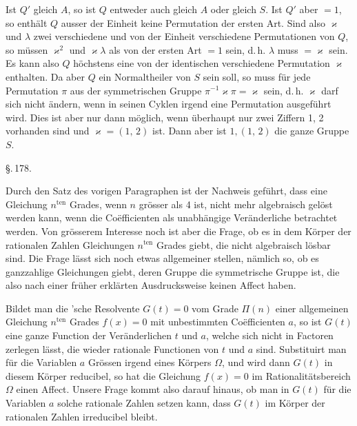 
Ist $Q'$ gleich $A$, so ist $Q$ entweder auch gleich $A$ oder gleich $S$. Ist $Q'$ aber $=1$, so enthält $Q$ ausser der Einheit keine Permutation der ersten Art. Sind also $\varkappa$ und $\lambda$ zwei verschiedene und von der Einheit verschiedene Permutationen von $Q$, so müssen $\varkappa^2$ und $\varkappa\lambda$ als von der ersten Art $=1$ sein, d.\,h. $\lambda$ muss $=\varkappa$ sein. Es kann also $Q$ höchstens eine von der identischen verschiedene Permutation $\varkappa$ enthalten. Da aber $Q$ ein Normaltheiler von $S$ sein soll, so muss für jede Permutation $\pi$ aus der symmetrischen Gruppe $\pi^{-1}\varkappa\pi = \varkappa$ sein, d.\,h. $\varkappa$ darf sich nicht ändern, wenn in seinen Cyklen irgend eine Permutation ausgeführt wird. Dies ist aber nur dann möglich, wenn überhaupt nur zwei Ziffern 1, 2 vorhanden sind und $\varkappa = (1,\,2)$ ist. Dann aber ist $1, (1,\,2)$ die ganze Gruppe $S$.

\begin{center}
\S.\,178.

\end{center}

Durch den Satz des vorigen Paragraphen ist der Nachweis geführt, dass eine Gleichung $n^{\text{ten}}$ Grades, wenn $n$ grösser als 4 ist, nicht mehr algebraisch gelöst werden kann, wenn die Co\"efficienten als unabhängige Veränderliche betrachtet werden. Von grösserem Interesse noch ist aber die Frage, ob es in dem Körper der rationalen Zahlen Gleichungen $n^{\text{ten}}$ Grades giebt, die nicht algebraisch lösbar sind. Die Frage lässt sich noch etwas allgemeiner stellen, nämlich so, ob es ganzzahlige Gleichungen giebt, deren Gruppe die symmetrische Gruppe ist, die also nach einer früher erklärten Ausdrucksweise keinen Affect haben.

Bildet man die 'sche Resolvente $G(t)=0$ vom Grade $\Pi(n)$ einer allgemeinen Gleichung $n^{\text{ten}}$ Grades $f(x)=0$ mit unbestimmten Co\"efficienten $a$, so ist $G(t)$ eine ganze Function der Veränderlichen $t$ und $a$, welche sich nicht in Factoren zerlegen lässt, die wieder rationale Functionen von $t$ und $a$ sind. Substituirt man für die Variablen $a$ Grössen irgend eines Körpers $\Omega$, und wird dann $G(t)$ in diesem Körper reducibel, so hat die Gleichung $f(x)=0$ im Rationalitätsbereich $\Omega$ einen Affect. Unsere Frage kommt also darauf hinaus, ob man in $G(t)$ für die Variablen $a$ solche rationale Zahlen setzen kann, dass $G(t)$ im Körper der rationalen Zahlen irreducibel bleibt.
